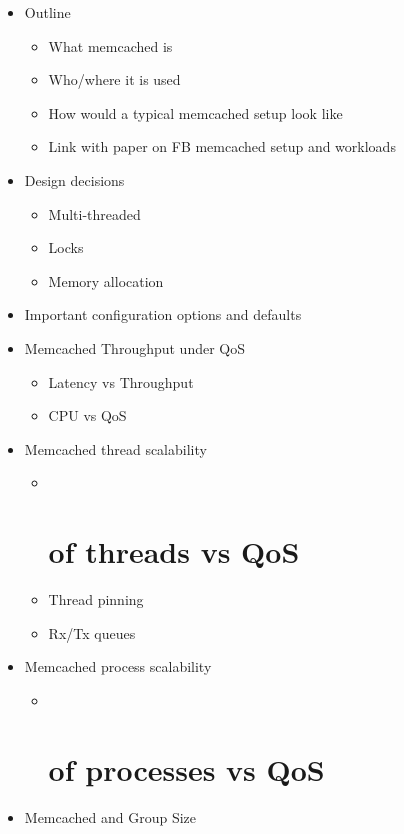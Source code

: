 \begin{enumerate}
  \begin{itemize}
  \tightlist
  \item
    Outline

    \begin{itemize}
    \tightlist
    \item
      What memcached is
    \item
      Who/where it is used
    \item
      How would a typical memcached setup look like
    \item
      Link with paper on FB memcached setup and workloads
    \end{itemize}
  \item
    Design decisions

    \begin{itemize}
    \tightlist
    \item
      Multi-threaded
    \item
      Locks
    \item
      Memory allocation
    \end{itemize}
  \item
    Important configuration options and defaults
  \item
    Memcached Throughput under QoS

    \begin{itemize}
    \tightlist
    \item
      Latency vs Throughput
    \item
      CPU vs QoS
    \end{itemize}
  \item
    Memcached thread scalability

    \begin{itemize}
    \item ~
      \section{of threads vs QoS}\label{of-threads-vs-qos}
    \item
      Thread pinning
    \item
      Rx/Tx queues
    \end{itemize}
  \item
    Memcached process scalability

    \begin{itemize}
    \item ~
      \section{of processes vs QoS}\label{of-processes-vs-qos}
    \end{itemize}
  \item
    Memcached and Group Size


\end{itemize}
\end{enumerate}

